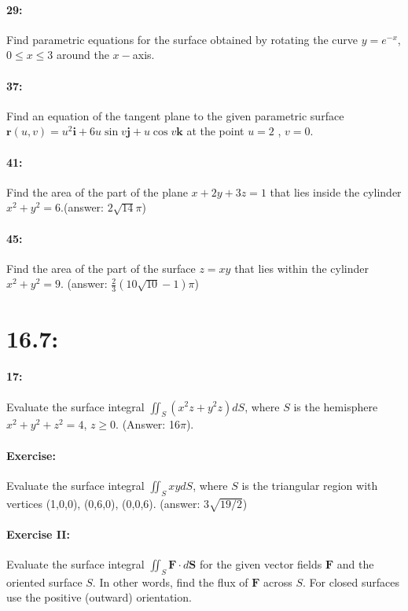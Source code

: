 \documentclass[10pt,letter]{article}
\newcommand{\F}{\mathbf{F}}
\renewcommand{\i}{\mathbf{i}}
\renewcommand{\j}{\mathbf{j}}
\renewcommand{\k}{\mathbf{k}}
\newcommand{\sint}{\iint_S\F\cdot d\mathbf{S}}
\begin{document}
\paragraph{29:} Find parametric equations for the surface obtained by rotating the curve $y=e^{-x}$, $0\leq x\leq 3$ around the $x-$axis.
\paragraph{37:} Find an equation of the tangent plane to the given parametric surface $\mathbf{r}(u, v) = u^2 \i + 6u \sin v \j + u \cos v \k$ at the point $u = 2$ , $v = 0$.
\paragraph{41:} Find the area of the part of the plane $x + 2y + 3z = 1$ that lies inside the cylinder $x^2 + y^2 = 6$.(answer: $2\sqrt{14}\pi$)
\paragraph{45:} Find the area of the part of the surface $z = xy$ that lies within the cylinder $x^2 + y^2 = 9$. (answer: $\frac{2}{3}(10\sqrt{10}-1)\pi$)

\section*{16.7:}
\paragraph{17:} Evaluate the surface integral $\iint_S(x^2z+y^2z)dS$, where $S$ is the hemisphere $x^2+y^2+z^2=4$, $z\geq 0$. (Answer: 16$\pi$).
\paragraph{Exercise:} Evaluate the surface integral $\iint_SxydS$, where $S$ is the triangular region with vertices (1,0,0), (0,6,0), (0,0,6). (answer: $3\sqrt{19/2}$)
\paragraph{Exercise II:} Evaluate the surface integral $\sint$ for the given vector fields $\F$ and the oriented surface $S$. In other words, find the flux of $\F$ across $S$. For closed surfaces use the positive (outward) orientation.
\end{document}
